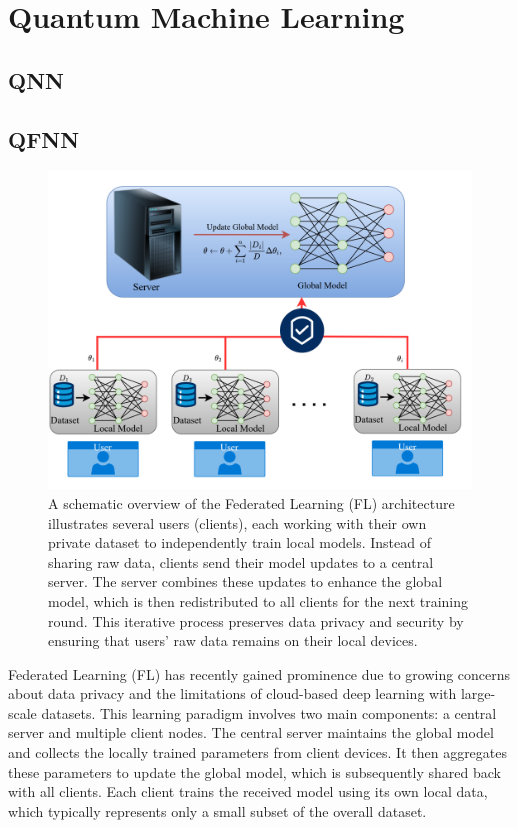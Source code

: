 \documentclass[10pt]{article}
\begin{document}
\section{Quantum Machine Learning}
\subsection{QNN}


\subsection{QFNN}
\begin{figure}[h!]
	\centering
	\includegraphics[height = 0.30\textheight]{img/FL_model.png}
	\caption{A schematic overview of the Federated Learning (FL) architecture illustrates several users (clients), each working with their own private dataset to independently train local models. Instead of sharing raw data, clients send their model updates to a central server. The server combines these updates to enhance the global model, which is then redistributed to all clients for the next training round. This iterative process preserves data privacy and security by ensuring that users' raw data remains on their local devices.}
\end{figure}
Federated Learning (FL) has recently gained prominence due to growing concerns about data privacy and the limitations of cloud-based deep learning with large-scale datasets. This learning paradigm involves two main components: a central server and multiple client nodes. The central server maintains the global model and collects the locally trained parameters from client devices. It then aggregates these parameters to update the global model, which is subsequently shared back with all clients. Each client trains the received model using its own local data, which typically represents only a small subset of the overall dataset.
\end{document}
